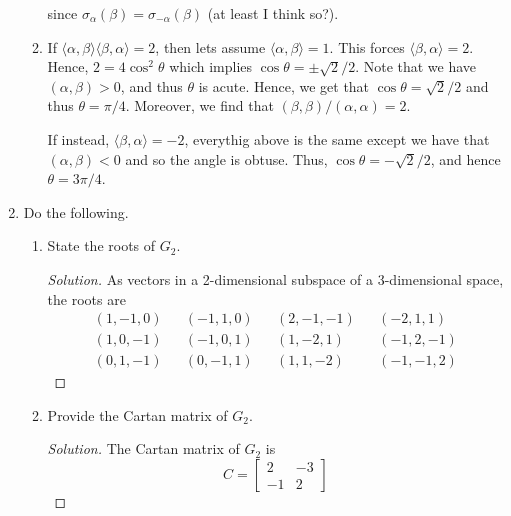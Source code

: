 \documentclass[12pt]{article}
\theoremstyle{definition}
\newenvironment{solution}
  {\renewcommand\qedsymbol{$\blacksquare$}\begin{proof}[Solution]}
  {\end{proof}}
\begin{document}
\begin{enumerate}
\begin{enumerate}[label=(\Alph*)]
                    since $\sigma_{\alpha}(\beta)=\sigma_{-\alpha}(\beta)$ (at
                    least I think so?).
                \item If $\langle\alpha, \beta\rangle\langle\beta,
                    \alpha\rangle=2$, then lets assume $\langle\alpha,
                    \beta\rangle=1$. This forces $\langle\beta,
                    \alpha\rangle=2$. Hence, $2=4\cos^2\theta$ which implies
                    $\cos\theta=\pm\sqrt{2}/2$. Note that we have $(\alpha, \beta)>0$, and thus $\theta$ is
                    acute. Hence, we get that $\cos\theta=\sqrt{2}/2$ and thus $\theta=\pi/4$. Moreover, we find
                    that $(\beta, \beta)/(\alpha, \alpha)=2$.\par\hspace{4mm}
                    If instead, $\langle\beta, \alpha\rangle=-2$, everythig
                    above is the same except we have that $(\alpha, \beta)<0$
                    and so the angle is obtuse. Thus, $\cos\theta=-\sqrt{2}/2$,
                    and hence $\theta=3\pi/4$.
            \end{enumerate}
        \item Do the following.
            \begin{enumerate}[label=(\Alph*)]
                \item State the roots of $G_2$.
            \begin{solution}
                As vectors in a 2-dimensional subspace of a 3-dimensional
                space, the roots are
                \begin{align*}
                    &(1, -1, 0)& &(-1, 1, 0)& &(2, -1, -1)& &(-2, 1, 1)& \\
                    &(1, 0, -1)& &(-1, 0, 1)& &(1, -2, 1)& &(-1, 2, -1)& \\
                    &(0, 1, -1)& &(0, -1, 1)& &(1, 1, -2)& &(-1, -1, 2)
                \end{align*}
            \end{solution}
        \item Provide the Cartan matrix of $G_2$.
            \begin{solution}
                The Cartan matrix of $G_2$ is 
                \begin{equation*}
                    C=\begin{bmatrix} 2&-3\\-1&2 \end{bmatrix} 
                \end{equation*}

\end{solution}
\end{enumerate}
\end{enumerate}
\end{document}
